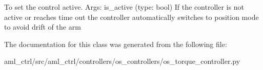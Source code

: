 \begin{DoxyVerb}To set the control active. 
Args: is_active (type: bool)
If the controller is not active or reaches time out
the controller automatically switches to position mode to avoid drift of the arm
\end{DoxyVerb}
 

The documentation for this class was generated from the following file\-:\begin{DoxyCompactItemize}
\item 
aml\-\_\-ctrl/src/aml\-\_\-ctrl/controllers/os\-\_\-controllers/os\-\_\-torque\-\_\-controller.\-py\end{DoxyCompactItemize}
